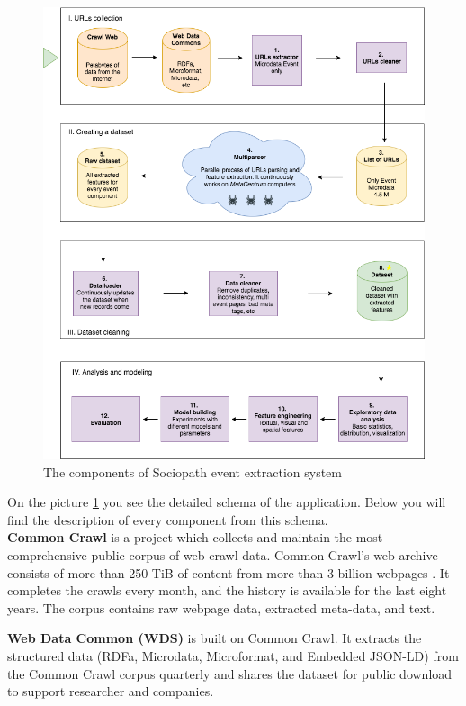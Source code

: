 \begin{figure}[h]
\begin{center}
\includegraphics[width=1.0\textwidth]{figures04/Architecure}
\caption{The components of Sociopath event extraction system}
\label{fig:architecture}
\end{center}
\end{figure}

On the picture \ref{fig:architecture} you see the detailed schema of the application. Below you will find the description of every component from this schema.\\

\textbf{Common Crawl} is a project which collects and maintain the most comprehensive public corpus of web crawl data. Common Crawl's web archive consists of more than 250 TiB of content from more than 3 billion webpages \cite{commoncrawl}. It completes the crawls every month, and the history is available for the last eight years. The corpus contains raw webpage data, extracted meta-data, and text.

\textbf{Web Data Common (WDS)}\cite{webdatacommons} is built on Common Crawl. It extracts the structured data (RDFa, Microdata, Microformat, and Embedded JSON-LD) from the Common Crawl corpus quarterly and shares the dataset for public download to support researcher and companies. 

